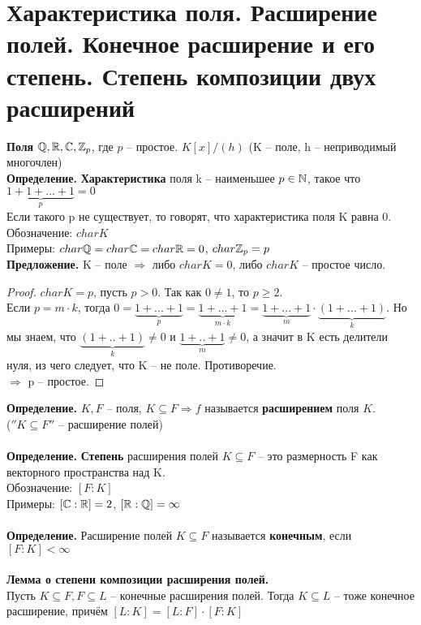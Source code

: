\section{Характеристика поля. Расширение полей. Конечное расширение и его степень. Степень композиции двух расширений}

\textbf{Поля} $\mathbb{Q}, \mathbb{R}, \mathbb{C}, \mathbb{Z}_p$, где $p$ -- простое. $K[x]/(h)$ (K -- поле, h -- неприводимый многочлен)\\
\textbf{Определение.} \textbf{Характеристика} поля k -- наименьшее $p\in \mathbb{N}$, такое что $\underbrace{1+1+...+1}_{p}=0$\\
Если такого p не существует, то говорят, что характеристика поля K равна 0.\\
Обозначение: $char K$\\
Примеры: $char\mathbb{Q}=char\mathbb{C}=char\mathbb{R}=0$, $char\mathbb{Z}_p=p$\\
\textbf{Предложение.} K -- поле $\Rightarrow$ либо $char K=0$, либо $char K$ -- простое число.
\begin{proof}
    $char K = p$, пусть $p> 0$. Так как $0\neq 1$, то $p\geqslant 2$.\\
    Если $p=m\cdot k$, тогда $0=\underbrace{1+...+1}_{p}=\underbrace{1+...+1}_{m\cdot k}=\underbrace{1+...+1}_{m}\cdot\underbrace{(1+...+1)}_{k}$. Но мы знаем, что $\underbrace{(1+..+1)}_{k}\neq 0$ и $\underbrace{1+..+1}_{m}\neq 0$, а значит в K есть делители нуля, из чего следует, что K -- не поле. Противоречие.\\
    $\Rightarrow$ p -- простое.
\end{proof}
\noindent \textbf{Определение.} $K, F$ -- поля, $K\subseteq F\Rightarrow f$ называется \textbf{расширением} поля $K$.\\ ($''K\subseteq F''$ -- расширение полей)\\\\
\textbf{Определение.} \textbf{Степень} расширения полей $K\subseteq F$ -- это размерность F как векторного пространства над K.\\
Обозначение: $[F:K]$\\
Примеры: $[\mathbb{C}:\mathbb{R}]=2$, $[\mathbb{R}:\mathbb{Q}]=\infty$\\\\
\textbf{Определение.} Расширение полей $K\subseteq F$ называется \textbf{конечным}, если $[F:K]<\infty$\\\\
\textbf{Лемма о степени композиции расширения полей.}\\
Пусть $K\subseteq F, F\subseteq L$ -- конечные расширения полей. Тогда $K\subseteq L$ -- тоже конечное расширение, причём $[L:K]=[L:F]\cdot[F:K]$
